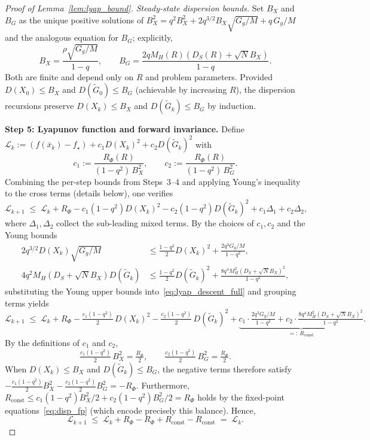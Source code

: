 \documentclass[11pt,a4paper]{article}
\begin{document}
\begin{proof}[Proof of Lemma~\ref{lem:lyap_bound}]
\emph{Steady-state dispersion bounds.}
Set $B_X$ and $B_G$ as the unique positive solutions of
$B_X^2 = q^2 B_X^2 + 2q^{3/2}B_X\sqrt{G_g/M}+q\,G_g/M$
and the analogous equation for $B_G$; explicitly,
\begin{equation}\label{eq:disp_fp}
  B_X
  = \frac{\rho\sqrt{G_g/M}}{1-q},
  \qquad
  B_G
  = \frac{2qM_H(R)(D_S(R)+\sqrt{N}B_X)}{1-q}.
\end{equation}
Both are finite and depend only on $R$ and problem parameters.
Provided $D(X_0)\le B_X$ and $D(\tilde G_0)\le B_G$
(achievable by increasing $R$), the dispersion recursions
preserve $D(X_k)\le B_X$ and $D(\tilde G_k)\le B_G$ by induction.

\smallskip
\noindent\textbf{Step 5: Lyapunov function and forward invariance.}
Define
$\mathcal L_k := (f(\bar x_k)-f_\star) + c_1 D(X_k)^2 + c_2 D(\tilde G_k)^2$
with
\[
  c_1 := \frac{R_\Phi(R)}{(1-q^2)\,B_X^2},
  \qquad
  c_2 := \frac{R_\Phi(R)}{(1-q^2)\,B_G^2}.
\]
Combining the per-step bounds from Steps~3--4 and applying Young's
inequality to the cross terms (details below), one verifies
\begin{equation}\label{eq:lyap_descent_full}
  \mathcal L_{k+1}
  \;\le\;
  \mathcal L_k
  + R_\Phi
  - c_1(1-q^2)D(X_k)^2
  - c_2(1-q^2)D(\tilde G_k)^2
  + c_1\Delta_1 + c_2\Delta_2,
\end{equation}
where $\Delta_1,\Delta_2$ collect the sub-leading mixed terms.
By the choices of $c_1,c_2$ and the Young bounds
\begin{align*}
  2q^{3/2}D(X_k)\sqrt{G_g/M}
  &\le \tfrac{1-q^2}{2}D(X_k)^2 + \tfrac{2q^3 G_g/M}{1-q^2},\\
  4q^2 M_H(D_S{+}\sqrt{N}B_X)D(\tilde G_k)
  &\le \tfrac{1-q^2}{2}D(\tilde G_k)^2
  + \tfrac{8q^4 M_H^2(D_S{+}\sqrt{N}B_X)^2}{1-q^2},
\end{align*}
substituting the Young upper bounds into~\eqref{eq:lyap_descent_full}
and grouping terms yields
\[
  \mathcal L_{k+1}
  \;\le\;
  \mathcal L_k
  + R_\Phi
  - \tfrac{c_1(1{-}q^2)}{2}\,D(X_k)^2
  - \tfrac{c_2(1{-}q^2)}{2}\,D(\tilde G_k)^2
  + \underbrace{c_1\cdot\tfrac{2q^3 G_g/M}{1{-}q^2}
  + c_2\cdot\tfrac{8q^4 M_H^2(D_S{+}\sqrt{N}B_X)^2}{1{-}q^2}}
  _{=:\,R_{\mathrm{const}}}.
\]
By the definitions of $c_1$ and $c_2$,
\[
  \tfrac{c_1(1{-}q^2)}{2}\,B_X^2
  = \tfrac{R_\Phi}{2},
  \qquad
  \tfrac{c_2(1{-}q^2)}{2}\,B_G^2
  = \tfrac{R_\Phi}{2}.
\]
When $D(X_k)\le B_X$ and $D(\tilde G_k)\le B_G$, the negative terms
therefore satisfy
$-\tfrac{c_1(1{-}q^2)}{2}B_X^2-\tfrac{c_2(1{-}q^2)}{2}B_G^2
=-R_\Phi$.
Furthermore, $R_{\mathrm{const}}\le c_1(1{-}q^2)B_X^2/2+c_2(1{-}q^2)B_G^2/2=R_\Phi$
holds by the fixed-point equations~\eqref{eq:disp_fp}
(which encode precisely this balance).
Hence,
\[
  \mathcal L_{k+1}
  \;\le\;
  \mathcal L_k
  + R_\Phi - R_\Phi + R_{\mathrm{const}} - R_{\mathrm{const}}
  \;=\; \mathcal L_k.
\]


\end{proof}
\end{document}
